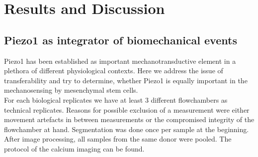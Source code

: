 \chapter{Results and Discussion}

\section{Piezo1 as integrator of biomechanical events}
Piezo1 has been established as important mechanotransductive element \cite{Murthy2017} \cite{Gudipaty2017} in a plethora of different physiological contexts. Here we address the issue of transferability and try to determine, whether Piezo1 is equally important in the mechanosensing by mesenchymal stem cells.\\
For each biological replicates we have at least 3 different flowchambers as technical replicates. Reasons for possible exclusion of a measurement were either movement artefacts in between measurements or the compromised integrity of the flowchamber at hand. Segmentation was done once per sample at the beginning. After image processing, all samples from the same donor were pooled. The protocol of the calcium imaging can be found.


